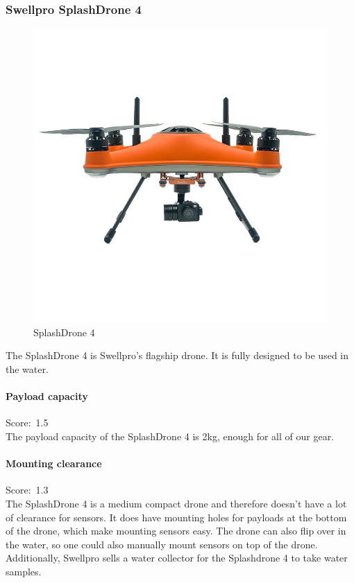 \newpage
\subsubsection{Swellpro SplashDrone 4}
\begin{figure}
\includegraphics[width=1\linewidth]{uav/models/01_splashdrone4.png}
\caption{SplashDrone 4}
\end{figure}
The SplashDrone 4 \cite{splashdrone4} is Swellpro's flagship drone. It is fully designed to be used in the water.

\paragraph{Payload capacity}\mbox{Score: 1.5} \\
The payload capacity of the SplashDrone 4 is 2kg, enough for all of our gear.

\paragraph{Mounting clearance}\mbox{Score: 1.3} \\
The SplashDrone 4 is a medium compact drone and therefore doesn't have a lot of clearance for sensors. It does have mounting holes for payloads at the bottom of the drone, which make mounting sensors easy. The drone can also flip over in the water, so one could also manually mount sensors on top of the drone. Additionally, Swellpro sells a water collector for the Splashdrone 4 to take water samples. \cite{watercollector}

